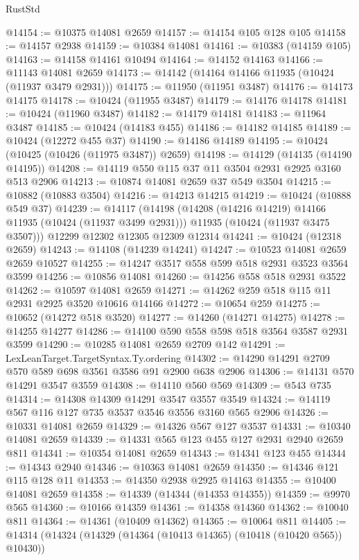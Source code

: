 \begin{lexlean}{RustStd}
\begin{coremodule}
@14154 := @10375 @14081 @2659
@14157 := @14154 @105 @128 @105
@14158 := @14157 @2938
@14159 := @10384 @14081
@14161 := @10383 (@14159 @105)
@14163 := @14158 @14161 @10494
@14164 := @14152 @14163
@14166 := @11143 @14081 @2659
@14173 := @14142 (@14164 @14166 @11935 (@10424 (@11937 @3479 @2931)))
@14175 := @11950 (@11951 @3487)
@14176 := @14173 @14175
@14178 := @10424 (@11955 @3487)
@14179 := @14176 @14178
@14181 := @10424 (@11960 @3487)
@14182 := @14179 @14181
@14183 := @11964 @3487
@14185 := @10424 (@14183 @455)
@14186 := @14182 @14185
@14189 := @10424 (@12272 @455 @37)
@14190 := @14186 @14189
@14195 := @10424 (@10425 (@10426 (@11975 @3487)) @2659)
@14198 := @14129 (@14135 (@14190 @14195))
@14208 := @14119 @550 @115 @37 @11 @3504 @2931 @2925 @3160 @513 @2906
@14213 := @10874 @14081 @2659 @37 @549 @3504
@14215 := @10882 (@10883 @3504)
@14216 := @14213 @14215
@14219 := @10424 (@10888 @549 @37)
@14239 := @14117
    (@14198
      (@14208 (@14216 @14219) @14166 @11935 (@10424 (@11937 @3499 @2931)))
      @11935
      (@10424 (@11937 @3475 @3507)))
    @12299
    @12302
    @12305
    @12309
    @12314
@14241 := @10424 (@12318 @2659)
@14243 := @14108 (@14239 @14241)
@14247 := @10523 @14081 @2659 @2659 @10527
@14255 := @14247 @3517 @558 @599 @518 @2931 @3523 @3564 @3599
@14256 := @10856 @14081
@14260 := @14256 @558 @518 @2931 @3522
@14262 := @10597 @14081 @2659
@14271 := @14262 @259 @518 @115 @11 @2931 @2925 @3520 @10616 @14166
@14272 := @10654 @259
@14275 := @10652 (@14272 @518 @3520)
@14277 := @14260 (@14271 @14275)
@14278 := @14255 @14277
@14286 := @14100 @590 @558 @598 @518 @3564 @3587 @2931 @3599
@14290 := @10285 @14081 @2659 @2709 @142
@14291 := LexLeanTarget.TargetSyntax.Ty.ordering
@14302 := @14290 @14291 @2709 @570 @589 @698 @3561 @3586 @91 @2900 @638 @2906
@14306 := @14131 @570 @14291 @3547 @3559
@14308 := @14110 @560 @569
@14309 := @543 @735
@14314 := @14308 @14309 @14291 @3547 @3557 @3549
@14324 := @14119 @567 @116 @127 @735 @3537 @3546 @3556 @3160 @565 @2906
@14326 := @10331 @14081 @2659
@14329 := @14326 @567 @127 @3537
@14331 := @10340 @14081 @2659
@14339 := @14331 @565 @123 @455 @127 @2931 @2940 @2659 @811
@14341 := @10354 @14081 @2659
@14343 := @14341 @123 @455
@14344 := @14343 @2940
@14346 := @10363 @14081 @2659
@14350 := @14346 @121 @115 @128 @11
@14353 := @14350 @2938 @2925 @14163
@14355 := @10400 @14081 @2659
@14358 := @14339 (@14344 (@14353 @14355))
@14359 := @9970 @565
@14360 := @10166 @14359
@14361 := @14358 @14360
@14362 := @10040 @811
@14364 := @14361 (@10409 @14362)
@14365 := @10064 @811
@14405 := @14314
    (@14324
      (@14329 (@14364 (@10413 @14365) (@10418 (@10420 @565)) @10430))

\end{coremodule}
\end{lexlean}
